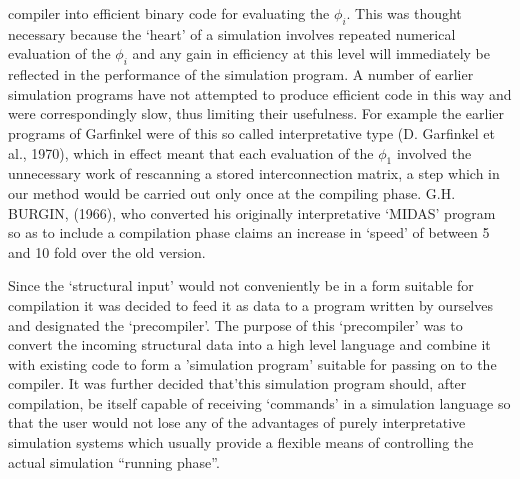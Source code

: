 compiler into efficient binary code for evaluating the $\phi_{i}$. This was thought necessary because the `heart' of a simulation involves repeated numerical evaluation of the $\phi_{i}$ and any gain in efficiency at this level will immediately be reflected in the performance of the simulation program. A number of earlier simulation programs have not attempted to produce efficient code in this way and were correspondingly slow, thus limiting their usefulness. For example the earlier programs of Garfinkel were of this so called interpretative type (D. Garfinkel et al., 1970), which in effect meant that each evaluation of the $\phi_{1}$ involved the unnecessary work of rescanning a stored interconnection matrix, a step which in our method would be carried out only once at the compiling phase. G.H. BURGIN, (1966), who converted his originally interpretative `MIDAS' program so as to include a compilation phase claims an increase in `speed' of between 5 and 10 fold over the old version.

Since the `structural input' would not conveniently be in a form suitable for compilation it was decided to feed it as data to a program written by ourselves and designated the `precompiler'. The purpose of this `precompiler' was to convert the incoming structural data into a high level language and combine it with existing code to form a 'simulation program' suitable for passing on to the compiler. It was further decided that'this simulation program should, after compilation, be itself capable of receiving `commands' in a simulation language so that the user would not lose any of the advantages of purely interpretative simulation systems which usually provide a flexible means of controlling the actual simulation ``running phase''.

